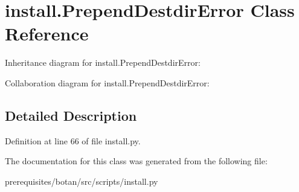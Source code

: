 \hypertarget{classinstall_1_1_prepend_destdir_error}{}\section{install.\+Prepend\+Destdir\+Error Class Reference}
\label{classinstall_1_1_prepend_destdir_error}


Inheritance diagram for install.\+Prepend\+Destdir\+Error\+:


Collaboration diagram for install.\+Prepend\+Destdir\+Error\+:


\subsection{Detailed Description}


Definition at line 66 of file install.\+py.



The documentation for this class was generated from the following file\+:\begin{DoxyCompactItemize}
\item 
prerequisites/botan/src/scripts/install.\+py\end{DoxyCompactItemize}
